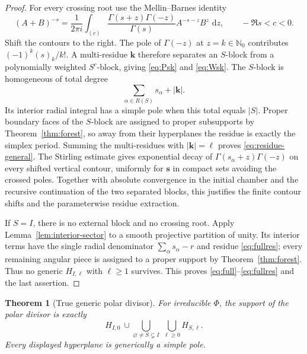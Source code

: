 \documentclass[11pt]{article}
\newtheorem{theorem}{Theorem}[section]
\renewcommand{\boxed}[1]{#1}
\newcommand{\Nzero}{\mathbb N_0}
\newcommand{\dd}{\,\mathrm d}
\newcommand{\RF}[2]{(#1)_{#2}}
\begin{document}
\begin{proof}
For every crossing root use the Mellin--Barnes identity
\[
 (A+B)^{-s}=\frac1{2\pi i}
 \int_{(c)}\frac{\Gamma(s+z)\Gamma(-z)}{\Gamma(s)}
 A^{-s-z}B^z\,\dd z,
 \qquad -\Re s<c<0.
\]
Shift the contours to the right.  The pole of $\Gamma(-z)$ at
$z=k\in\Nzero$ contributes
$(-1)^k\RF{s}{k}/k!$.  A multi-residue $\mathbf k$ therefore separates
an $S$-block from a polynomially weighted $S^c$-block, giving
\eqref{eq:Psk} and \eqref{eq:Wsk}.  The $S$-block is homogeneous of total
degree
\[
 \sum_{\alpha\in R(S)}s_\alpha+|\mathbf k|.
\]
Its interior radial integral has a simple pole when this total equals
$|S|$.  Proper boundary faces of the $S$-block are assigned to proper
subsupports by Theorem~\ref{thm:forest}, so away from their hyperplanes
the residue is exactly the simplex period.  Summing the multi-residues
with $|\mathbf k|=\ell$ proves \eqref{eq:residue-general}.  The
Stirling estimate gives exponential decay of
$\Gamma(s_\alpha+z)\Gamma(-z)$ on every shifted vertical contour,
uniformly for $\mathbf s$ in compact sets avoiding the crossed poles.
Together with absolute convergence in the initial chamber and the
recursive continuation of the two separated blocks, this justifies the
finite contour shifts and the parameterwise residue extraction.

If $S=I$, there is no external block and no crossing root.  Apply
Lemma~\ref{lem:interior-sector} to a smooth projective partition of
unity.  Its interior terms have the single radial denominator
$\sum_\alpha s_\alpha-r$ and residue \eqref{eq:fullres}; every
remaining angular piece is assigned to a proper support by
Theorem~\ref{thm:forest}.  Thus no generic $H_{I,\ell}$ with
$\ell\geq1$ survives.  This proves \eqref{eq:full}--\eqref{eq:fullres}
and the last assertion.
\end{proof}

\begin{theorem}[True generic polar divisor]\label{thm:true-locus}
For irreducible $\Phi$, the support of the polar divisor is exactly
\begin{equation}\label{eq:true-divisor}
 \boxed{
 H_{I,0}\ \cup\!
 \bigcup_{\varnothing\ne S\subsetneq I}
 \ \bigcup_{\ell\geq0}H_{S,\ell}.}
\end{equation}
Every displayed hyperplane is generically a simple pole.
\end{theorem}
\end{document}
